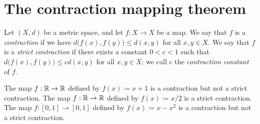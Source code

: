 \section{The contraction mapping theorem}\label{ii:sec:6.6}

\begin{defn}[Contraction]\label{ii:6.6.1}
  Let \((X, d)\) be a metric space, and let \(f : X \to X\) be a map.
  We say that \(f\) is a \emph{contraction} if we have \(d\big(f(x), f(y)\big) \leq d(x, y)\) for all \(x, y \in X\).
  We say that \(f\) is a \emph{strict contraction} if there exists a constant \(0 < c < 1\) such that \(d\big(f(x), f(y)\big) \leq c d(x, y)\) for all \(x, y \in X\);
  we call \(c\) the \emph{contraction constant} of \(f\).
\end{defn}

\begin{eg}\label{ii:6.6.2}
  The map \(f : \mathbb{R} \to \mathbb{R}\) defined by \(f(x) \coloneqq x + 1\) is a contraction but not a strict contraction.
  The map \(f : \mathbb{R} \to \mathbb{R}\) defined by \(f(x) \coloneqq x / 2\) is a strict contraction.
  The map \(f : [0, 1] \to [0, 1]\) defined by \(f(x) \coloneqq x - x^2\) is a contraction but not a strict contraction.
\end{eg}

